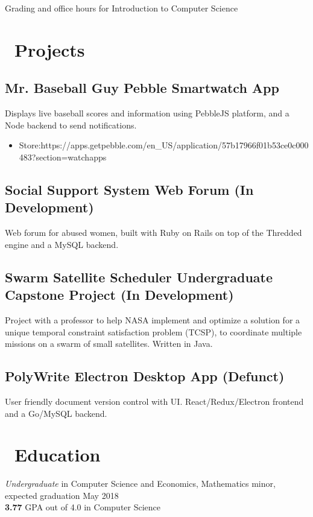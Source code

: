 \documentclass{resume}
\begin{document}
\space
Grading and office hours for Introduction to Computer Science


\section{\faWrench\ Projects}
\subsection{\textbf{Mr. Baseball Guy} Pebble Smartwatch App}
Displays live baseball scores and information using PebbleJS platform, and a Node backend to send notifications.
\begin{itemize}
  \item Store:\quad https://apps.getpebble.com/en\_US/application/57b17966f01b53ce0c000483?section=watchapps
\end{itemize}
\subsection{\textbf{Social Support System} Web Forum (In Development)}
Web forum for abused women, built with Ruby on Rails on top of the Thredded engine and a MySQL backend.\subsection{\textbf{Swarm Satellite Scheduler} Undergraduate Capstone Project (In Development)}
Project with a professor to help NASA implement and optimize a solution for a unique temporal constraint satisfaction problem (TCSP), to coordinate multiple missions on a swarm of small satellites. Written in Java. 
\subsection{\textbf{PolyWrite} Electron Desktop App (Defunct)}
User friendly document version control with UI. React/Redux/Electron frontend and a Go/MySQL backend.

\section{\faGraduationCap\ Education}
\textit{Undergraduate} in Computer Science and Economics, Mathematics minor, expected graduation May 2018 \\
\textbf{3.77} GPA out of 4.0 in Computer Science

%
%
\end{document}
